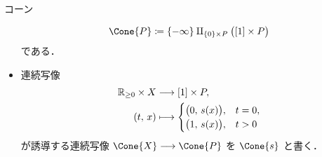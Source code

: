 \documentclass[TQFT_main]{subfiles}
\begin{document}
\begin{mydef}[label=def:str-cone,breakable]{コーン}
\begin{itemize}
        \begin{align}
            \Cone{P} \coloneqq \{-\infty\} \amalg_{\{0\} \times P} \bigl( [1] \times P \bigr) 
        \end{align}
        である．
        \item 連続写像
        \begin{align}
            \mathbb{R}_{\ge 0} \times X &\longrightarrow [1] \times P, \\
            (t,\, x) &\longmapsto 
            \begin{cases}
                \bigl( 0,\, s(x) \bigr), &t=0, \\
                \bigl( 1,\, s(x) \bigr), &t>0
            \end{cases}
        \end{align}
        が誘導する連続写像 $\Cone{X} \lto \Cone{P}$ を $\Cone{s}$ と書く．
    \end{itemize}
\end{mydef}
\end{document}
